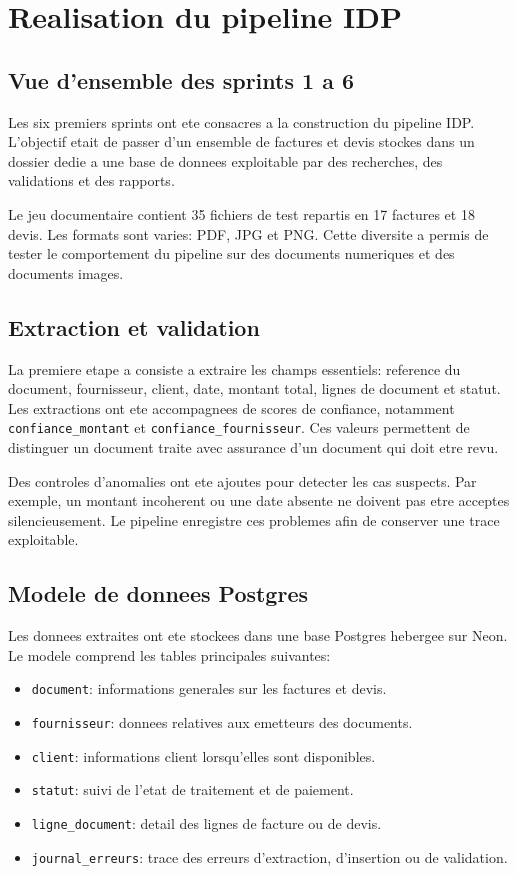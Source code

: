 \chapter{Realisation du pipeline IDP}
\label{chap:realisation-pipeline-idp}

\section{Vue d'ensemble des sprints 1 a 6}

Les six premiers sprints ont ete consacres a la construction du pipeline IDP. L'objectif etait de passer d'un ensemble de factures et devis stockes dans un dossier dedie a une base de donnees exploitable par des recherches, des validations et des rapports.

Le jeu documentaire contient 35 fichiers de test repartis en 17 factures et 18 devis. Les formats sont varies: PDF, JPG et PNG. Cette diversite a permis de tester le comportement du pipeline sur des documents numeriques et des documents images.

\section{Extraction et validation}

La premiere etape a consiste a extraire les champs essentiels: reference du document, fournisseur, client, date, montant total, lignes de document et statut. Les extractions ont ete accompagnees de scores de confiance, notamment \texttt{confiance\_montant} et \texttt{confiance\_fournisseur}. Ces valeurs permettent de distinguer un document traite avec assurance d'un document qui doit etre revu.

Des controles d'anomalies ont ete ajoutes pour detecter les cas suspects. Par exemple, un montant incoherent ou une date absente ne doivent pas etre acceptes silencieusement. Le pipeline enregistre ces problemes afin de conserver une trace exploitable.

\section{Modele de donnees Postgres}

Les donnees extraites ont ete stockees dans une base Postgres hebergee sur Neon. Le modele comprend les tables principales suivantes:

\begin{itemize}
  \item \texttt{document}: informations generales sur les factures et devis.
  \item \texttt{fournisseur}: donnees relatives aux emetteurs des documents.
  \item \texttt{client}: informations client lorsqu'elles sont disponibles.
  \item \texttt{statut}: suivi de l'etat de traitement et de paiement.
  \item \texttt{ligne\_document}: detail des lignes de facture ou de devis.
  \item \texttt{journal\_erreurs}: trace des erreurs d'extraction, d'insertion ou de validation.
\end{itemize}

